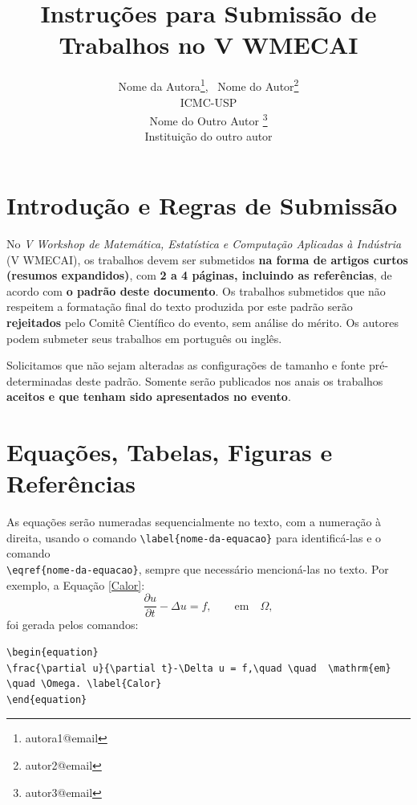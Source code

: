 \documentclass[a4,11pt]{wmecai}
\begin{document}

\title{Instruções para Submissão de Trabalhos no V WMECAI}

\author{
{\large Nome da Autora}\thanks{autora1@email}, ~{\large Nome do Autor}\thanks{autor2@email}\\
{\small ICMC-USP} \\
{\large Nome do Outro Autor }\thanks{autor3@email} \\
{\small Instituição do outro autor } \\
}

\criartitulo


\section{ Introdução e Regras de Submissão}
%

No \textit{V Workshop de Matemática, Estatística e Computação Aplicadas à Indústria} (V WMECAI), os trabalhos devem ser submetidos {\bf na forma de artigos curtos (resumos expandidos)}, com {\bf 2 a 4 páginas, incluindo as referências}, de acordo com {\bf o padrão deste documento}.
Os trabalhos submetidos que não respeitem a formatação final do texto produzida por este padrão serão {\bf rejeitados} pelo Comitê Científico do evento, sem análise do mérito. Os autores podem submeter seus trabalhos em português ou inglês.

Solicitamos que não sejam alteradas as configurações de tamanho e fonte pré-deter\-mi\-na\-das deste padrão. Somente serão publicados nos anais os trabalhos {\bf aceitos e que tenham sido apresentados no evento}.

\section{Equações, Tabelas, Figuras e Referências}

As equações serão numeradas sequencialmente no texto, com a numeração à direita, usando o
comando  \verb!\label{nome-da-equacao}! para identificá-las e o comando \\
\verb!\eqref{nome-da-equacao}!, sempre que necessário
mencioná-las no texto. Por exemplo, a Equação \eqref{Calor}:
%
\begin{equation}
\frac{\partial u}{\partial t}-\Delta u = f, \quad \quad  \mathrm{em} \quad \Omega, \label{Calor}
\end{equation}
%
foi gerada pelos comandos:
\begin{verbatim}
\begin{equation}
\frac{\partial u}{\partial t}-\Delta u = f,\quad \quad  \mathrm{em}
\quad \Omega. \label{Calor}
\end{equation}
\end{verbatim}
\end{document}
